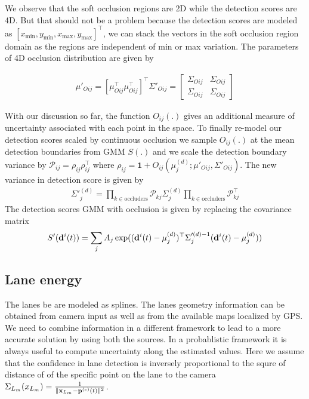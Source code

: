 \documentclass[10pt,twocolumn,letterpaper]{article}
\begin{document}
We observe that the soft occlusion regions are 2D while the detection scores
are 4D. But that should not be a problem because the detection scores are
modeled as $[x_{\text{min}}, y_{\text{min}}, x_{\text{max}},
y_{\text{max}}]^\top$, we can stack the vectors in the soft occlusion region
domain as the regions are independent of min or max variation. The parameters
of 4D occlusion distribution are given by

\begin{align}
  \mu'_{Oij} = [\mu_{Oij}^\top \mu_{Oij}^\top]^\top
  \Sigma'_{Oij} = \begin{bmatrix}
    \Sigma_{Oij} & \Sigma_{Oij} \\
\Sigma_{Oij} & \Sigma_{Oij}
  \end{bmatrix}
\end{align}

With our
discussion so far, the function $O_{ij}(.)$ gives an additional measure of
uncertainty associated with each point in the space. To finally re-model our
detection scores scaled by continuous occlusion we sample $O_{ij}(.)$ at the
mean detection boundaries from GMM $S(.)$ and we scale the detection boundary
variance by $\mathcal{P}_{ij} = \rho_{ij}\rho_{ij}^\top$ where $\rho_{ij} =
\mathbf{1} + O_{ij}(\mu^{(d)}_j; \mu'_{Oij}, \Sigma'_{Oij})$. The new variance
in detection score is given by 
%
\begin{align}
  \Sigma'^{(d)}_j = \prod_{k \in \text{occluders}} \mathcal{P}_{kj}
  \Sigma^{(d)}_j
  \prod_{k \in \text{occluders}} \mathcal{P}^\top_{kj}
\end{align}
%
The detection scores GMM with occlusion is given by replacing the covariance
matrix
\begin{align}
  S'(\mathbf{d}^{i}(t)) = \sum_j A_j \exp((\mathbf{d}^{i}(t)-\mu^{(d)}_j)^\top \Sigma'^{(d)-1}_j
  (\mathbf{d}^{i}(t)-\mu^{(d)}_j))
\end{align}

\newcommand{\Beizer}{B\'eizer }
\subsection{Lane energy}
\label{sec:laneEnergy}
 The lanes be are modeled as splines. The lanes geometry information can be
 obtained from camera input as well as from the available maps localized by
 GPS. We need to combine information in a different framework to lead to a
more accurate solution by using both the sources. In a probablistic framework
it is always useful to compute uncertainty along the estimated values.
Here we assume that the confidence in lane detection is inversely proportional
to the squre of distance of of the specific point on the lane to the camera
\newcommand{\LaneUncertainty}[1]{\Sigma_{L_m}(#1)}
$\Sigma_{L_m}({x}_{L_m}) = \frac{1}{\|\mathbf{x}_{L_m} - \mathbf{p}^{(c)}(t)\|^2}$.
\end{document}
